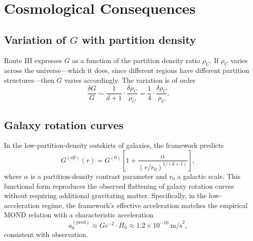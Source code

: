 \documentclass[11pt,twocolumn,a4paper]{article}
\theoremstyle{definition}
\theoremstyle{remark}
\newcommand{\Gnewton}{G}
\begin{document}
\section{Cosmological Consequences}
\label{sec:cosmology}

\subsection{Variation of $\Gnewton$ with partition density}

Route III expresses $\Gnewton$ as a function of the partition density ratio $\rho_C$. If $\rho_C$ varies across the universe---which it does, since different regions have different partition structures---then $\Gnewton$ varies accordingly. The variation is of order
\begin{equation}
\frac{\delta\Gnewton}{\Gnewton} \sim \frac{1}{d+1}\cdot \frac{\delta\rho_C}{\rho_C} = \frac{1}{4}\cdot \frac{\delta\rho_C}{\rho_C}.
\end{equation}

\subsection{Galaxy rotation curves}

In the low-partition-density outskirts of galaxies, the framework predicts
\begin{equation}
\Gnewton^{(\text{eff})}(r) = \Gnewton^{(0)}\left[1 + \frac{\alpha}{(r/r_0)^{1/(d+1)}}\right],
\end{equation}
where $\alpha$ is a partition-density contrast parameter and $r_0$ a galactic scale. This functional form reproduces the observed flattening of galaxy rotation curves \citep{rubin1980,mcgaugh2011} without requiring additional gravitating matter. Specifically, in the low-acceleration regime, the framework's effective acceleration matches the empirical MOND relation \citep{milgrom1983,famaey2012} with a characteristic acceleration
\begin{equation}
a_0^{(\text{pred})} \approx \Gnewton c^{-2}\cdot H_0 \approx 1.2 \times 10^{-10}~\text{m/s}^2,
\end{equation}
consistent with observation.
\end{document}
